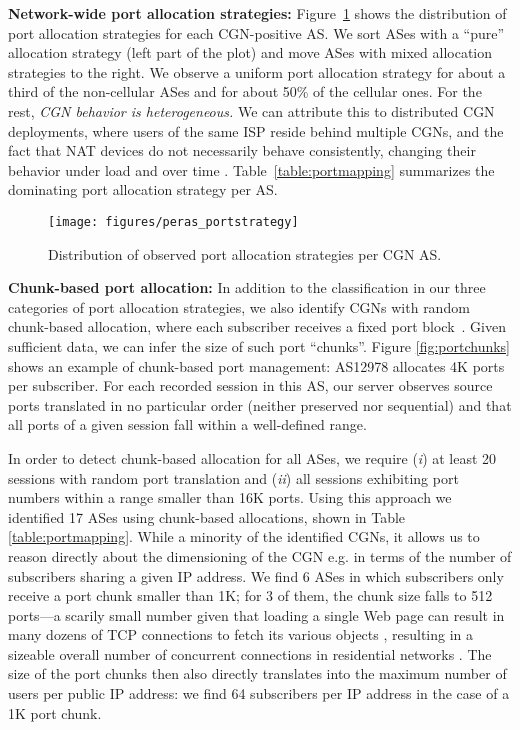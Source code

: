 \documentclass[10pt]{sig-alternate-05-2015}
\newcommand{\parax}[1]{\vspace{0.2em} \noindent \textbf{#1:}}
\def\first{({\it i})\xspace}
\def\second{({\it ii})\xspace}
\begin{document}
\parax{Network-wide port allocation strategies} 
Figure~\ref{fig:portbinginpolicies} shows the distribution of port allocation
strategies for each CGN-positive AS. We sort ASes with a ``pure'' 
allocation strategy (left part of the plot) and move ASes with mixed allocation 
strategies to the right. We observe a uniform port allocation strategy
for about a third of the non-cellular ASes and for about 50\% of the cellular ones.
For the rest, \textit{CGN behavior is heterogeneous.} We can attribute this to
distributed CGN deployments, where users of the same ISP reside behind
multiple CGNs, and the fact that NAT devices do not necessarily 
behave consistently, changing their behavior under load and over time 
\cite{rfc5780}. Table~\ref{table:portmapping} summarizes the dominating 
port allocation strategy per AS.




\begin{figure}
  \begin{center}
\texttt{[image: figures/peras\_portstrategy]}
  \caption{Distribution of observed port allocation strategies per CGN AS.}
    \label{fig:portbinginpolicies}
  \end{center}
\end{figure}



\parax{Chunk-based port allocation} In addition to the classification in our 
three categories of port allocation strategies, we also identify CGNs with 
random chunk-based allocation, where each subscriber receives a fixed port
block~\cite{cisconat}. Given sufficient data, we can infer the size of such port
``chunks''. Figure \ref{fig:portchunks} shows an example of chunk-based port 
management: AS12978 allocates 4K ports per subscriber. For each recorded session
in this AS, our server observes source ports translated in no particular order 
(neither preserved nor sequential) and that all ports of a given session fall
within a well-defined range.


In order to detect chunk-based allocation for all ASes, we require \first 
at least 20 sessions with random port translation
and \second all sessions exhibiting port numbers within a 
range smaller than 16K ports. Using this approach we identified 17 ASes 
using chunk-based allocations, shown in Table 
\ref{table:portmapping}. While a minority of the identified CGNs, it
allows us to reason directly about the dimensioning of the CGN e.g. in
terms of the number of subscribers sharing a given IP address.
We find 6 ASes in which subscribers only receive a port chunk smaller
than 1K; for 3 of them, the chunk size falls to 512 ports---a scarily
small number given that loading a single Web page can result in many
dozens of TCP connections to fetch its various objects
\cite{butkiewicz2011understanding}, resulting in a sizeable overall
number of concurrent connections in residential networks
\cite{alcock2010investigating}. The size of the port chunks then also
directly translates into the maximum number of users per public IP
address: we find 64 subscribers per IP address in the case of a 1K
port chunk.
\end{document}
